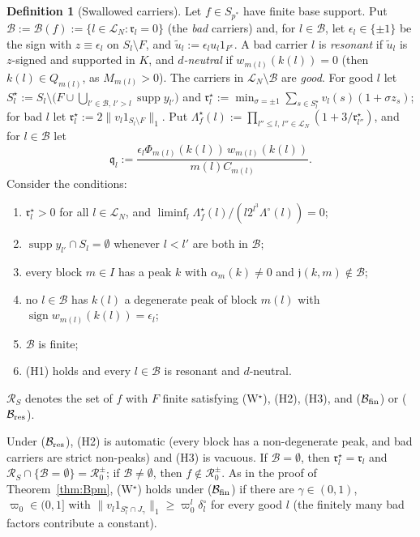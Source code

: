\documentclass[10pt]{amsart}
\theoremstyle{definition}
\newtheorem{definition}[theorem]{Definition}
\theoremstyle{remark}
\newcommand{\supp}{\operatorname{supp}}
\newcommand{\sgn}{\operatorname{sign}}
\begin{document}
\begin{definition}[Swallowed carriers]\label{def:swallowed}
Let $f\in S_{p^*}$ have finite base support.  Put $\mathcal B:=\mathcal
B(f):=\{l\in\mathcal L_N:\mathfrak r_l=0\}$ (the \emph{bad} carriers) and,
for $l\in\mathcal B$, let $\epsilon_l\in\{\pm1\}$ be the sign with
$z\equiv\epsilon_l$ on $S_l\setminus F$, and $\tilde u_l:=\epsilon_lu_l
1_{F^c}$.  A bad carrier $l$ is \emph{resonant} if $\tilde u_l$ is
$z$-signed and supported in $K$, and \emph{$d$-neutral} if
$w_{m(l)}(k(l))=0$ (then $k(l)\in Q_{m(l)}$, as $M_{m(l)}>0$).  The carriers
in $\mathcal L_N\setminus\mathcal B$ are \emph{good}.  For good $l$ let
$S^\star_l:=S_l\setminus\big(F\cup\bigcup_{l'\in\mathcal B,\,l'>l}\supp
y_{l'}\big)$ and $\mathfrak r^\star_l:=\min_{\sigma=\pm1}\sum_{s\in
S^\star_l}v_l(s)(1+\sigma z_s)$; for bad $l$ let $\mathfrak r^\star_l:=
2\|v_l1_{S_l\setminus F}\|_1$.  Put $\Lambda^\star_f(l):=\prod_{l''\le l,\,
l''\in\mathcal L_N}(1+3/\mathfrak r^\star_{l''})$, and for $l\in\mathcal B$
let
\[
 \mathfrak q_l:=\frac{\epsilon_l\Phi_{m(l)}(k(l))\,w_{m(l)}(k(l))}{m(l)C_{m(l)}} .
\]
Consider the conditions:
\begin{enumerate}
\item[(W$^\star$)] $\mathfrak r^\star_l>0$ for all $l\in\mathcal L_N$, and
$\liminf_l\Lambda^\star_f(l)/(l2^{l^3}\Lambda^\circ(l))=0$;
\item[(H1)] $\supp y_{l'}\cap S_l=\emptyset$ whenever $l<l'$ are both in
$\mathcal B$;
\item[(H2)] every block $m\in I$ has a peak $k$ with $\alpha_m(k)\ne0$
and $\mathfrak j(k,m)\notin\mathcal B$;
\item[(H3)] no $l\in\mathcal B$ has $k(l)$ a degenerate peak of block
$m(l)$ with $\sgn w_{m(l)}(k(l))=\epsilon_l$;
\item[($\mathcal B_{\rm fin}$)] $\mathcal B$ is finite;
\item[($\mathcal B_{\rm res}$)] \textup{(H1)} holds and every $l\in\mathcal
B$ is resonant and $d$-neutral.
\end{enumerate}
$\mathcal R_S$ denotes the set of $f$ with $F$ finite satisfying
\textup{(W$^\star$)}, \textup{(H2)}, \textup{(H3)}, and
\textup{($\mathcal B_{\rm fin}$)} or \textup{($\mathcal B_{\rm res}$)}.
\end{definition}

Under ($\mathcal B_{\rm res}$), (H2) is automatic (every block has a
non-degenerate peak, and bad carriers are strict non-peaks) and (H3) is
vacuous.  If $\mathcal B=\emptyset$, then $\mathfrak r^\star_l=\mathfrak r_l$
and $\mathcal R_S\cap\{\mathcal B=\emptyset\}=\mathcal R_0^\pm$; if
$\mathcal B\ne\emptyset$, then $f\notin\mathcal R_0^\pm$.  As in the proof
of Theorem~\ref{thm:Bpm}, (W$^\star$) holds under ($\mathcal B_{\rm fin}$)
if there are $\gamma\in(0,1)$, $\varpi_0\in(0,1]$ with $\|v_l
1_{S^\star_l\cap J_\gamma}\|_1\ge\varpi_0^l\delta^\circ_l$ for every good
$l$ (the finitely many bad factors contribute a constant).
\end{document}
